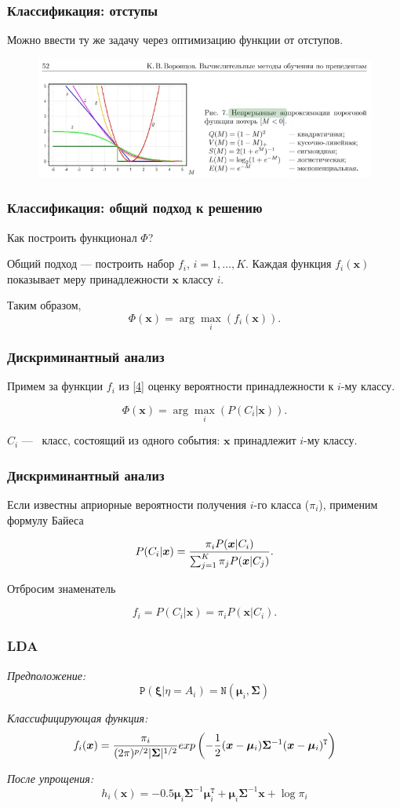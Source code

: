 \documentclass[11pt]{beamer}
\begin{document}
	\begin{frame}
		\frametitle{Классификация: отступы}
		Можно ввести ту же задачу через оптимизацию функции от отступов.
		\begin{figure}
			\centering
			\includegraphics[width=0.7\linewidth]{imgs/margins}

			\label{fig:margins}
		\end{figure}
	\end{frame}

	\begin{frame}
		\frametitle{Классификация: общий подход к решению}
		Как построить функционал $\Phi$?
		
		
		Общий подход --- построить набор $f_i$, $i = 1, \ldots, K$. Каждая функция $f_i(\bm{x})$ показывает меру принадлежности $\bm{x}$ классу $i$. 
		
		Таким образом,
		\begin{equation}
			\Phi(\bm{x}) = \arg\max_i(f_i(\bm{x})).
			\label{4}
		\end{equation}
	\end{frame}
	\begin{frame}
		\frametitle{Дискриминантный анализ}
		Примем за функции $f_i$ из \ref{4} оценку вероятности принадлежности к $i$-му классу.
		
		$$\Phi(\bm{x}) = \arg\max_i (P(C_i|\bm{x})).$$
		
		$C_i$ ---  класс, состоящий из одного события: $\bm{x}$ принадлежит $i$-му классу.
	\end{frame}
	\begin{frame}
		\frametitle{Дискриминантный анализ}
		Если известны априорные вероятности получения $i$-го класса ($\pi_i$), применим формулу Байеса
		
		$$P(C_i|\bm{x}) = {{\pi_i P(\bm{x}|C_i)}\over{\sum_{j=1}^{K} \pi_j P(\bm{x}|C_j)}}.$$
		 
		 Отбросим знаменатель
		
		$$f_i = P(C_i|\bm{x}) = \pi_i P(\bm{x}|C_i).$$
	\end{frame}
	\begin{frame}
		\frametitle{LDA}
		\textit{Предположение:}	
		$$\mathtt{P}(\bm{\xi}|\eta = A_i) = \mathtt{N}(\bm{\mu}_i, \bm{\Sigma})$$
		
		\textit{Классифицирующая функция:}
		$$f_i(\bm{x}) = {{\pi_i}\over{(2\pi)^{p/2}|\bm{\Sigma}|^{1/2}}}exp\left(-{{1}\over{2}}(\bm{x} - \bm{\mu}_i)\bm{\Sigma}^{-1}(\bm{x} - \bm{\mu}_i)^\mathtt{T}\right)$$
		
		\textit{После упрощения:}
		$$h_i(\bm{x}) = -0.5 \bm{\mu}_i\bm{\Sigma}^{-1}\bm{\mu}_i^\mathtt{T} + \bm{\mu}_i\bm{\Sigma}^{-1}\bm{x} + \log\pi_i$$

	\end{frame}
\end{document}

